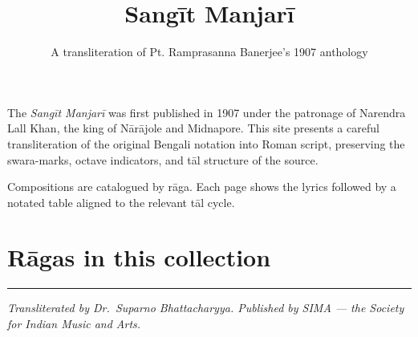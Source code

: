 \documentclass[
  letterpaper,
  12pt,
  openany]{book}
\title{Sangīt Manjarī}
\subtitle{A transliteration of Pt. Ramprasanna Banerjee's 1907
anthology}
\author{}
\date{}
\begin{document}
\frontmatter
\maketitle


\mainmatter
The \emph{Sangīt Manjarī} was first published in 1907 under the
patronage of Narendra Lall Khan, the king of Nārājole and Midnapore.
This site presents a careful transliteration of the original Bengali
notation into Roman script, preserving the swara-marks, octave
indicators, and tāl structure of the source.

Compositions are catalogued by rāga. Each page shows the lyrics followed
by a notated table aligned to the relevant tāl cycle.

\section{Rāgas in this collection}\label{rux101gas-in-this-collection}

\protect{}\label{ragas}

\begin{center}\rule{0.5\linewidth}{0.5pt}\end{center}

\emph{Transliterated by Dr.~Suparno Bhattacharyya. Published by SIMA ---
the Society for Indian Music and Arts.}


\backmatter
\end{document}
